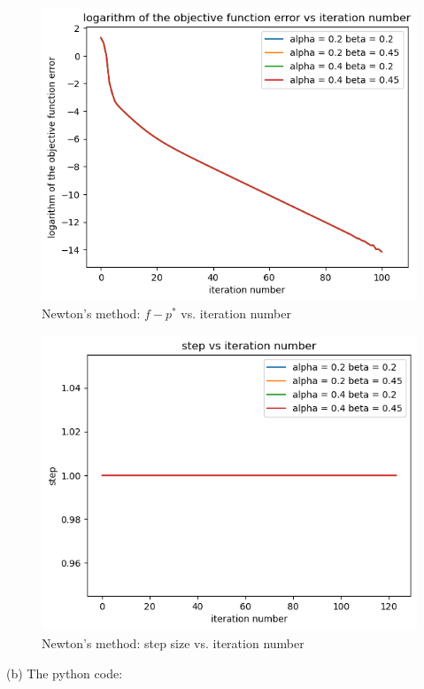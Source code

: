 \documentclass{article}
\begin{document}
\begin{figure}[H]
	\includegraphics[width=\linewidth]{9_31_a_obj_func.png}
	\caption{Newton's method: $f - p^*$ vs. iteration number}
\end{figure}

\begin{figure}[H]
	\includegraphics[width=\linewidth]{9_31_a_step.png}
	\caption{Newton's method: step size vs. iteration number}
\end{figure}

(b) The python code:
\end{document}
